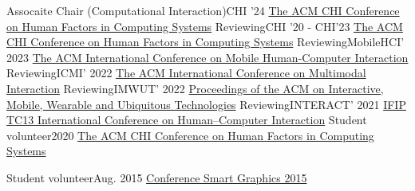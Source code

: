 
\resumeSubHeadingListStartNoLabel
\resumeSubheading
{Assocaite Chair (Computational Interaction)}{CHI '24}
{\href{https://sigchi.org/}{The ACM CHI Conference on Human Factors in Computing Systems}}{}\resumeSubheading
{Reviewing}{CHI '20 - CHI'23}
{\href{https://sigchi.org/}{The ACM CHI Conference on Human Factors in Computing Systems}}{}
\resumeSubheading
{Reviewing}{MobileHCI' 2023}
{\href{https://mobilehci.acm.org/2023/}{The ACM International Conference on Mobile Human-Computer Interaction}}{}
\resumeSubheading
{Reviewing}{ICMI' 2022}
{\href{https://icmi.acm.org/2022/}{The ACM International Conference on Multimodal Interaction}}{}
\resumeSubheading
{Reviewing}{IMWUT' 2022}
{\href{https://dl.acm.org/journal/imwut}{Proceedings of the ACM on Interactive, Mobile, Wearable and Ubiquitous Technologies}}{}
\resumeSubheading
{Reviewing}{INTERACT' 2021}
{\href{https://www.interact2021.org/}{IFIP TC13 International Conference on Human–Computer Interaction}}{}
\resumeSubheading
{Student volunteer}{2020}
{\href{https://sigchi.org/}{The ACM CHI Conference on Human Factors in Computing Systems}}{}

\resumeSubheading
{Student volunteer}{Aug. 2015}
{\href{http://www.smartgraphics.org/sg15/}{Conference Smart Graphics 2015}}{}



\resumeSubHeadingListEnd